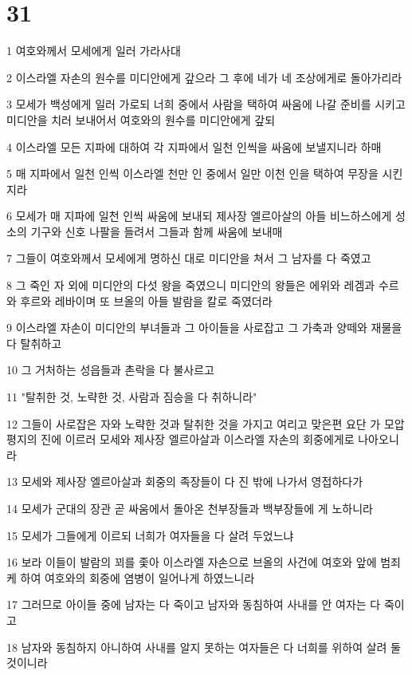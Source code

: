 \chapter{31}

\par 1 여호와께서 모세에게 일러 가라사대
\par 2 이스라엘 자손의 원수를 미디안에게 갚으라 그 후에 네가 네 조상에게로 돌아가리라
\par 3 모세가 백성에게 일러 가로되 너희 중에서 사람을 택하여 싸움에 나갈 준비를 시키고 미디안을 치러 보내어서 여호와의 원수를 미디안에게 갚되
\par 4 이스라엘 모든 지파에 대하여 각 지파에서 일천 인씩을 싸움에 보낼지니라 하매
\par 5 매 지파에서 일천 인씩 이스라엘 천만 인 중에서 일만 이천 인을 택하여 무장을 시킨지라
\par 6 모세가 매 지파에 일천 인씩 싸움에 보내되 제사장 엘르아살의 아들 비느하스에게 성소의 기구와 신호 나팔을 들려서 그들과 함께 싸움에 보내매
\par 7 그들이 여호와께서 모세에게 명하신 대로 미디안을 쳐서 그 남자를 다 죽였고
\par 8 그 죽인 자 외에 미디안의 다섯 왕을 죽였으니 미디안의 왕들은 에위와 레겜과 수르와 후르와 레바이며 또 브올의 아들 발람을 칼로 죽였더라
\par 9 이스라엘 자손이 미디안의 부녀들과 그 아이들을 사로잡고 그 가축과 양떼와 재물을 다 탈취하고
\par 10 그 거처하는 성읍들과 촌락을 다 불사르고
\par 11 "탈취한 것, 노략한 것, 사람과 짐승을 다 취하니라"
\par 12 그들이 사로잡은 자와 노략한 것과 탈취한 것을 가지고 여리고 맞은편 요단 가 모압 평지의 진에 이르러 모세와 제사장 엘르아살과 이스라엘 자손의 회중에게로 나아오니라
\par 13 모세와 제사장 엘르아살과 회중의 족장들이 다 진 밖에 나가서 영접하다가
\par 14 모세가 군대의 장관 곧 싸움에서 돌아온 천부장들과 백부장들에 게 노하니라
\par 15 모세가 그들에게 이르되 너희가 여자들을 다 살려 두었느냐
\par 16 보라 이들이 발람의 꾀를 좇아 이스라엘 자손으로 브올의 사건에 여호와 앞에 범죄케 하여 여호와의 회중에 염병이 일어나게 하였느니라
\par 17 그러므로 아이들 중에 남자는 다 죽이고 남자와 동침하여 사내를 안 여자는 다 죽이고
\par 18 남자와 동침하지 아니하여 사내를 알지 못하는 여자들은 다 너희를 위하여 살려 둘 것이니라
